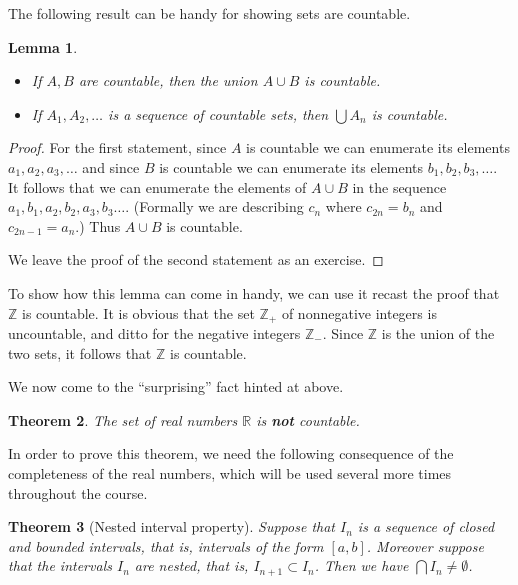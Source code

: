 \documentclass[11pt,oneside]{amsbook}
\newcommand{\ZZ}{\mathbb Z}
\newcommand{\RR}{\mathbb R}
\theoremstyle{definition}
\theoremstyle{plain}
\newtheorem{thm}{Theorem}[section]
\newtheorem{lem}[thm]{Lemma}
\theoremstyle{definition}
\theoremstyle{remark}
\numberwithin{equation}{section}
\numberwithin{figure}{section}
\begin{document}
The following result can be handy for showing sets are countable.

\begin{lem}
  \begin{itemize}
  \item If $A,B$ are countable, then the union $A\cup B$ is countable.
  \item If $A_1,A_2,\ldots$ is a sequence of countable sets, then $\bigcup A_n$ is countable.
  \end{itemize}
\end{lem}

\begin{proof}
  For the first statement, since $A$ is countable we can enumerate its elements $a_1,a_2,a_3,\ldots$ and since $B$ is countable we can enumerate its elements $b_1,b_2,b_3,\ldots$. It follows that we can enumerate the elements of $A\cup B$ in the sequence $a_1,b_1,a_2,b_2,a_3,b_3\ldots$. (Formally we are describing $c_n$ where $c_{2n}=b_n$ and $c_{2n-1}=a_n$.) Thus $A\cup B$ is countable.

  We leave the proof of the second statement as an exercise.
\end{proof}

To show how this lemma can come in handy, we can use it recast the proof that $\ZZ$ is countable. It is obvious that the set $\ZZ_+$ of nonnegative integers is uncountable, and ditto for the negative integers $\ZZ_-$. Since $\ZZ$ is the union of the two sets, it follows that $\ZZ$ is countable.

We now come to the ``surprising'' fact hinted at above.

\begin{thm}
  \label{thm:reals-uncountable}
  The set of real numbers $\RR$ is \textbf{not} countable.
\end{thm}

In order to prove this theorem, we need the following consequence of the completeness of the real numbers, which will be used several more times throughout the course.

\begin{thm}[Nested interval property]
  Suppose that $I_n$ is a sequence of closed and bounded intervals, that is, intervals of the form $[a,b]$. Moreover suppose that the intervals $I_n$ are nested, that is, $I_{n+1}\subset I_n$. Then we have $\bigcap I_n\neq\emptyset$.
\end{thm}
\end{document}
